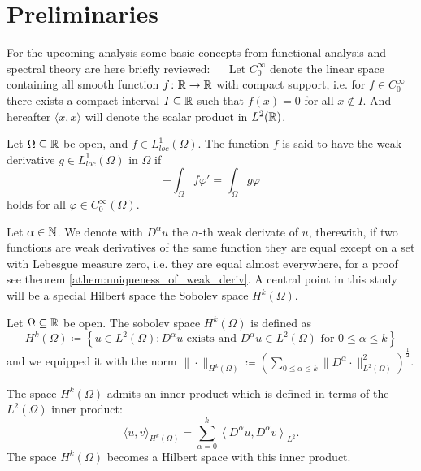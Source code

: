 \chapter{Preliminaries} \label{chap:2}

For the upcoming analysis some basic concepts from functional analysis and spectral theory are here briefly reviewed:
~\newline ~\newline
Let $C_{0}^{\infty}$ denote the linear space containing all smooth function $f \colon \mathbb{R} \rightarrow \mathbb{R}$ with compact support, i.e. for $f \in C_{0}^{\infty}$ there exists a compact interval $I \subseteq \mathbb{R}$ such that $f(x) = 0$ for all $x \notin I$. And hereafter $\langle x, x \rangle$ will denote the scalar product in $L^{2}(\mathbb{R})$.
\begin{definition}
Let $\Omega \subseteq \mathbb{R}$ be open, and $f \in L^{1}_{loc}(\Omega)$. The function $f$ is said to have the weak derivative $g \in L^{1}_{loc}(\Omega)$ in $\Omega$ if
  \[ - \int_{\Omega} f \varphi' = \int_{\Omega} g \varphi \]
holds for all $\varphi \in C_{0}^{\infty}(\Omega)$.
\end{definition}
Let $\alpha \in \mathbb{N}$. We denote with $D^{\alpha} u$ the $\alpha$-th weak derivate of $u$, therewith, if two functions are weak derivatives of the same function they are equal except on a set with Lebesgue measure zero, i.e. they are equal almost everywhere, for a proof see theorem \ref{athem:uniqueness_of_weak_deriv}. A central point in this study will be a special Hilbert space the Sobolev space $H^{k}(\Omega)$. 

\begin{definition} Let $\Omega \subseteq \mathbb{R}$ be open. The sobolev space $H^{k}(\Omega)$ is defined as
\[ H^{k}(\Omega) \coloneqq \left\{ u \in L^{2}(\Omega) : D^{\alpha} u \text{ exists and } D^{\alpha} u \in L^{2}(\Omega) \text{ for } 0 \leq \alpha \leq k \right\} \]
and we equipped it with the norm $\| \cdot \|_{H^{k}(\Omega)} \coloneqq \left( \sum_{0 \leq \alpha \leq k} \| D^{\alpha} \cdot \|_{L^{2}(\Omega)}^{2} \right)^{\frac{1}{2}}$.
\end{definition}	

The space $H^{k}(\Omega)$ admits an inner product which is defined in terms of the $L^{2}(\Omega)$ inner product:
	\[  \langle u,v \rangle_{H^{k}(\Omega)} = \sum_{\alpha=0}^{k} \left\langle D^{\alpha} u, D^{\alpha} v \right \rangle_{L^2}. \]
The space $H^{k}(\Omega)$ becomes a Hilbert space with this inner product.

